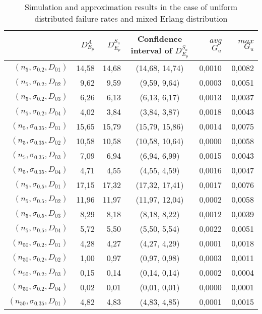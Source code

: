 \documentclass[preprint,12pt]{elsarticle}
\begin{document}
\begin{appendices}
\begin{table}[htbp]
  \centering
  \caption{Simulation and approximation results in the case of uniform distributed failure rates and mixed Erlang distribution}
 \begin{tabular}{rrrcrr}
    \toprule
& $D_{E_{p}}^{A}$ & $D_{E_{p}}^{S_{u}}$ & Confidence interval of $D_{E_{p}}^{S_{u}}$ & $avg$ $G_{u}$ & $max$ $G_{u}$ \\
    \midrule
 $(n_{5},\sigma_{0.2},D_{01})$ & 14,58 & 14,68 & (14,68, 14,74) & 0,0010 & 0,0082 \\
 $(n_{5},\sigma_{0.2},D_{02})$& 9,62  & 9,59  & (9,59, 9,64) & 0,0003 & 0,0051 \\
 $(n_{5},\sigma_{0.2},D_{03})$ & 6,26  & 6,13  & (6,13, 6,17) & 0,0013 & 0,0037 \\
 $(n_{5},\sigma_{0.2},D_{04})$& 4,02  & 3,84  & (3,84, 3,87) & 0,0018 & 0,0043 \\
 $(n_{5},\sigma_{0.35},D_{01})$ & 15,65 & 15,79 & (15,79, 15,86) & 0,0014 & 0,0075 \\
 $(n_{5},\sigma_{0.35},D_{02})$& 10,58 & 10,58 & (10,58, 10,64) & 0,0000 & 0,0058 \\
 $(n_{5},\sigma_{0.35},D_{03})$ & 7,09  & 6,94  & (6,94, 6,99) & 0,0015 & 0,0043 \\
 $(n_{5},\sigma_{0.35},D_{04})$ & 4,71  & 4,55  & (4,55, 4,59) & 0,0016 & 0,0047 \\
 $(n_{5},\sigma_{0.5},D_{01})$  & 17,15 & 17,32 & (17,32, 17,41) & 0,0017 & 0,0076 \\
 $(n_{5},\sigma_{0.5},D_{02})$ & 11,96 & 11,97 & (11,97, 12,04) & 0,0002 & 0,0058 \\
 $(n_{5},\sigma_{0.5},D_{03})$  & 8,29  & 8,18  & (8,18, 8,22) & 0,0012 & 0,0039 \\
 $(n_{5},\sigma_{0.5},D_{04})$ & 5,72  & 5,50  & (5,50, 5,54) & 0,0022 & 0,0051 \\
 $(n_{50},\sigma_{0.2},D_{01})$  & 4,28  & 4,27  & (4,27, 4,29) & 0,0001 & 0,0018 \\
 $(n_{50},\sigma_{0.2},D_{02})$  & 1,00  & 0,97  & (0,97, 0,98) & 0,0003 & 0,0011 \\
 $(n_{50},\sigma_{0.2},D_{03})$ & 0,15  & 0,14  & (0,14, 0,14) & 0,0002 & 0,0004 \\
 $(n_{50},\sigma_{0.2},D_{04})$  & 0,02  & 0,01  & (0,01, 0,01) & 0,0000 & 0,0001 \\
 $(n_{50},\sigma_{0.35},D_{01})$& 4,82  & 4,83  & (4,83, 4,85) & 0,0001 & 0,0015 \\

\end{tabular}
\end{table}
\end{appendices}
\end{document}
